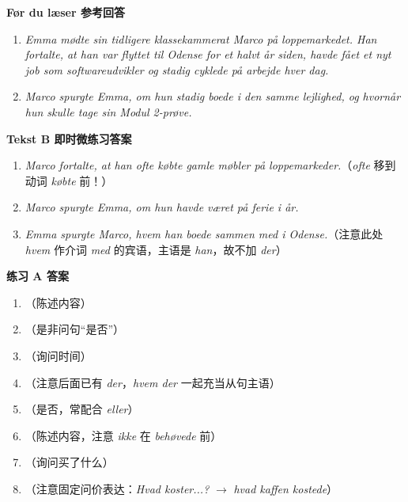 \begin{answerbox}
\textbf{Før du læser 参考回答}
\begin{enumerate}
  \item \textit{Emma mødte sin tidligere klassekammerat Marco på loppemarkedet. Han fortalte, at han var flyttet til Odense for et halvt år siden, havde fået et nyt job som softwareudvikler og stadig cyklede på arbejde hver dag.}
  \item \textit{Marco spurgte Emma, om hun stadig boede i den samme lejlighed, og hvornår hun skulle tage sin Modul 2-prøve.}
\end{enumerate}

\textbf{Tekst B 即时微练习答案}
\begin{enumerate}
  \item[(1)] \textit{Marco fortalte, at han ofte købte gamle møbler på loppemarkeder.}（\textit{ofte} 移到动词 \textit{købte} 前！）
  \item[(2)] \textit{Marco spurgte Emma, om hun havde været på ferie i år.}
  \item[(3)] \textit{Emma spurgte Marco, hvem han boede sammen med i Odense.}（注意此处 \textit{hvem} 作介词 \textit{med} 的宾语，主语是 \textit{han}，故不加 \textit{der}）
\end{enumerate}

\textbf{练习 A 答案}
\begin{enumerate}
  \item {}（陈述内容）
  \item {}（是非问句“是否”）
  \item {}（询问时间）
  \item {}（注意后面已有 \textit{der}，\textit{hvem der} 一起充当从句主语）
  \item {}（是否，常配合 \textit{eller}）
  \item {}（陈述内容，注意 \textit{ikke} 在 \textit{behøvede} 前）
  \item {}（询问买了什么）
  \item {}（注意固定问价表达：\textit{Hvad koster...?} $\rightarrow$ \textit{hvad kaffen kostede}）
\end{enumerate}


\end{answerbox}
